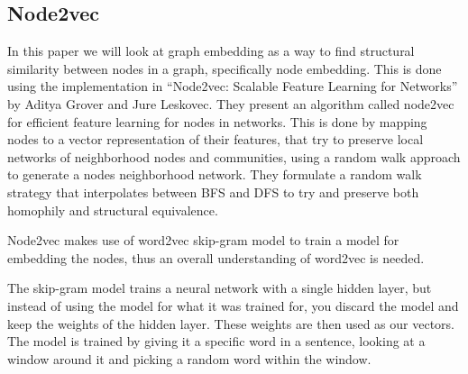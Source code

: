 \subsection{Node2vec}
In this paper we will look at graph embedding as a way to find structural similarity between nodes in a graph, specifically node embedding. This is done using the implementation in “Node2vec: Scalable Feature Learning for Networks” by Aditya Grover and Jure Leskovec. They present an algorithm called node2vec for efficient feature learning for nodes in networks. This is done by mapping nodes to a vector representation of their features, that try to preserve local networks of neighborhood nodes and communities, using a random walk approach to generate a nodes neighborhood network. They formulate a random walk strategy that interpolates between BFS and DFS to try and preserve both homophily and structural equivalence.

Node2vec makes use of word2vec skip-gram model to train a model for embedding the nodes, thus an overall understanding of word2vec is needed.

The skip-gram model trains a neural network with a single hidden layer, but instead of using the model for what it was trained for, you discard the model and keep the weights of the hidden layer. These weights are then used as our vectors. The model is trained by giving it a specific word in a sentence, looking at a window around it and picking a random word within the window. 